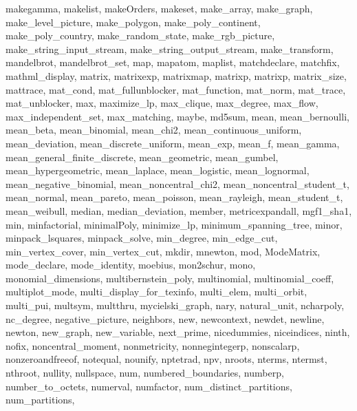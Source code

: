 {{    makegamma,
    makelist,
    makeOrders,
    makeset,
    make_array,
    make_graph,
    make_level_picture,
    make_polygon,
    make_poly_continent,
    make_poly_country,
    make_random_state,
    make_rgb_picture,
    make_string_input_stream,
    make_string_output_stream,
    make_transform,
    mandelbrot,
    mandelbrot_set,
    map,
    mapatom,
    maplist,
    matchdeclare,
    matchfix,
    mathml_display,
    matrix,
    matrixexp,
    matrixmap,
    matrixp,
    matrixp,
    matrix_size,
    mattrace,
    mat_cond,
    mat_fullunblocker,
    mat_function,
    mat_norm,
    mat_trace,
    mat_unblocker,
    max,
    maximize_lp,
    max_clique,
    max_degree,
    max_flow,
    max_independent_set,
    max_matching,
    maybe,
    md5sum,
    mean,
    mean_bernoulli,
    mean_beta,
    mean_binomial,
    mean_chi2,
    mean_continuous_uniform,
    mean_deviation,
    mean_discrete_uniform,
    mean_exp,
    mean_f,
    mean_gamma,
    mean_general_finite_discrete,
    mean_geometric,
    mean_gumbel,
    mean_hypergeometric,
    mean_laplace,
    mean_logistic,
    mean_lognormal,
    mean_negative_binomial,
    mean_noncentral_chi2,
    mean_noncentral_student_t,
    mean_normal,
    mean_pareto,
    mean_poisson,
    mean_rayleigh,
    mean_student_t,
    mean_weibull,
    median,
    median_deviation,
    member,
    metricexpandall,
    mgf1_sha1,
    min,
    minfactorial,
    minimalPoly,
    minimize_lp,
    minimum_spanning_tree,
    minor,
    minpack_lsquares,
    minpack_solve,
    min_degree,
    min_edge_cut,
    min_vertex_cover,
    min_vertex_cut,
    mkdir,
    mnewton,
    mod,
    ModeMatrix,
    mode_declare,
    mode_identity,
    moebius,
    mon2schur,
    mono,
    monomial_dimensions,
    multibernstein_poly,
    multinomial,
    multinomial_coeff,
    multiplot_mode,
    multi_display_for_texinfo,
    multi_elem,
    multi_orbit,
    multi_pui,
    multsym,
    multthru,
    mycielski_graph,
    nary,
    natural_unit,
    ncharpoly,
    nc_degree,
    negative_picture,
    neighbors,
    new,
    newcontext,
    newdet,
    newline,
    newton,
    new_graph,
    new_variable,
    next_prime,
    nicedummies,
    niceindices,
    ninth,
    nofix,
    noncentral_moment,
    nonmetricity,
    nonnegintegerp,
    nonscalarp,
    nonzeroandfreeof,
    notequal,
    nounify,
    nptetrad,
    npv,
    nroots,
    nterms,
    ntermst,
    nthroot,
    nullity,
    nullspace,
    num,
    numbered_boundaries,
    numberp,
    number_to_octets,
    numerval,
    numfactor,
    num_distinct_partitions,
    num_partitions,
}}
